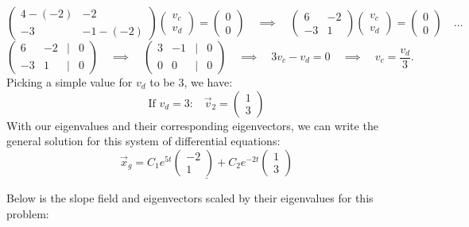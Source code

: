 \documentclass[a4paper,12pt]{article}
\begin{document}
$$ \left(\begin{matrix}
	4-(-2) & -2 \\
	-3 & -1-(-2)
\end{matrix}\right)\left(\begin{matrix}
	v_c \\
	v_d
\end{matrix}\right) = \left(\begin{matrix}
	0\\
	0
\end{matrix}\right) \quad\implies\quad \left(\begin{matrix}6 & -2 \\ -3 & 1\end{matrix}\right)\left(\begin{matrix}v_c \\ v_d\end{matrix}\right)=\left(\begin{matrix}0 \\ 0\end{matrix}\right) \quad\ldots
$$
$$ \left(\begin{matrix}
	6 & -2 & | & 0 \\
	-3 & 1 & | & 0
\end{matrix}\right) \quad\implies\quad \left(\begin{matrix}
	3 & -1 & | & 0 \\
	0 & 0 & | & 0
\end{matrix}\right) \quad\implies\quad 3v_c -v_d = 0 \quad\implies\quad  v_c=\frac{v_d}{3}.$$
Picking a simple value for $v_d$ to be 3, we have:
$$ \text{If $v_d=3$:}\quad \boxed{\vec{v}_2 = \left(\begin{matrix}
	1\\
	3
\end{matrix}\right)} $$
With our eigenvalues and their corresponding eigenvectors, we can write the general solution for this system of differential equations:
$$ \underline{\boxed{\vec{x}_g = C_1e^{5t}\left(\begin{matrix}
	-2\\
	1
\end{matrix}\right) + C_2e^{-2t}\left(\begin{matrix}
	1\\
	3
\end{matrix}\right)}} $$

Below is the slope field and eigenvectors scaled by their eigenvalues for this problem:
\end{document}
